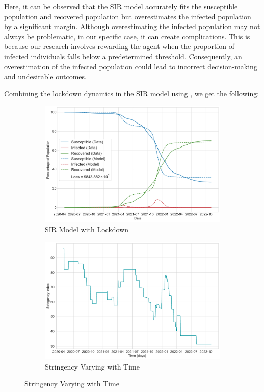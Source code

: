 \documentclass[tikz,fleqn,12pt]{wlscirep}
\begin{document}
Here, it can be observed that the SIR model accurately fits the susceptible population and recovered population but overestimates the infected population by a significant margin. Although overestimating the infected population may not always be problematic, in our specific case, it can create complications. This is because our research involves rewarding the agent when the proportion of infected individuals falls below a predetermined threshold. Consequently, an overestimation of the infected population could lead to incorrect decision-making and undesirable outcomes.

Combining the lockdown dynamics in the SIR model using , we get the following:
\begin{figure}[htbp!]
  \centering
  \begin{subfigure}[t]{\textwidth}
    \centering
    \includegraphics[scale=0.50]{images/SIR_model_with_lockdown_IND.pdf}
    \caption{SIR Model with Lockdown}
    \label{fig:SIR_model_with_lockdown_IND}
  \end{subfigure}
  
  \begin{subfigure}[t]{\textwidth}
    \centering
    \includegraphics[scale=0.50]{images/stringency_varying_with_time_IND.pdf}
    \caption{Stringency Varying with Time}
    \label{fig:stringency_varying_with_time_IND}
  \end{subfigure}
\end{figure}
\end{document}
